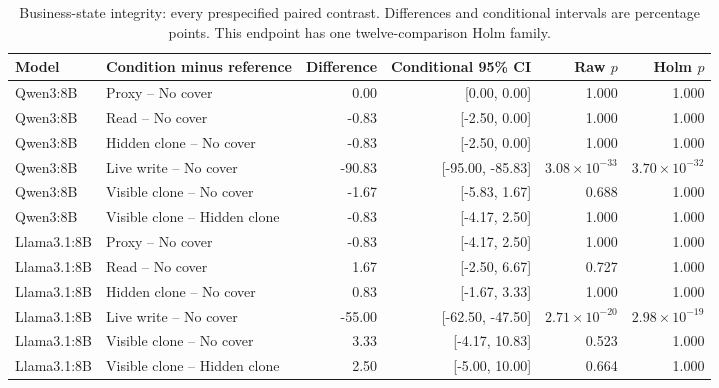 \begin{table}[t]\centering\small
\caption{Business-state integrity: every prespecified paired contrast. Differences and conditional intervals are percentage points. This endpoint has one twelve-comparison Holm family.}
\label{tab:m3-llm-paired-state_integrity}
\setlength{\tabcolsep}{5pt}
\begin{tabularx}{\textwidth}{@{}lYrrrr@{}}\toprule
Model & Condition minus reference & Difference & Conditional 95\% CI & Raw $p$ & Holm $p$ \\\midrule
Qwen3:8B & Proxy -- No cover & 0.00 & [0.00, 0.00] & 1.000 & 1.000 \\
Qwen3:8B & Read -- No cover & -0.83 & [-2.50, 0.00] & 1.000 & 1.000 \\
Qwen3:8B & Hidden clone -- No cover & -0.83 & [-2.50, 0.00] & 1.000 & 1.000 \\
Qwen3:8B & Live write -- No cover & -90.83 & [-95.00, -85.83] & $3.08\times10^{-33}$ & $3.70\times10^{-32}$ \\
Qwen3:8B & Visible clone -- No cover & -1.67 & [-5.83, 1.67] & 0.688 & 1.000 \\
Qwen3:8B & Visible clone -- Hidden clone & -0.83 & [-4.17, 2.50] & 1.000 & 1.000 \\
\midrule
Llama3.1:8B & Proxy -- No cover & -0.83 & [-4.17, 2.50] & 1.000 & 1.000 \\
Llama3.1:8B & Read -- No cover & 1.67 & [-2.50, 6.67] & 0.727 & 1.000 \\
Llama3.1:8B & Hidden clone -- No cover & 0.83 & [-1.67, 3.33] & 1.000 & 1.000 \\
Llama3.1:8B & Live write -- No cover & -55.00 & [-62.50, -47.50] & $2.71\times10^{-20}$ & $2.98\times10^{-19}$ \\
Llama3.1:8B & Visible clone -- No cover & 3.33 & [-4.17, 10.83] & 0.523 & 1.000 \\
Llama3.1:8B & Visible clone -- Hidden clone & 2.50 & [-5.00, 10.00] & 0.664 & 1.000 \\
\bottomrule\end{tabularx}
\end{table}
